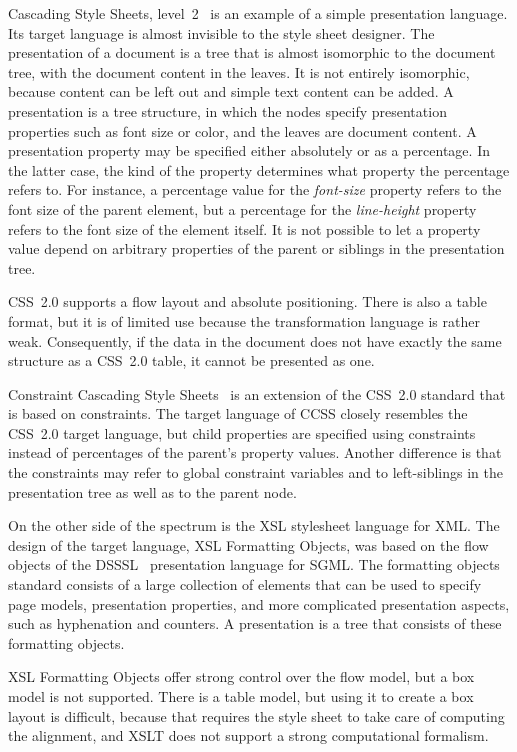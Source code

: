  Cascading Style Sheets, level~2~\cite{css2} is an example of a simple presentation language. Its target language is almost invisible to the style sheet designer.  \bc The presentation of a document is a tree that is almost isomorphic to the document tree, with the document content in the leaves. It is not entirely isomorphic, because content can be left out and simple text content can be added.  \ec A presentation is a tree structure, in which the nodes specify presentation properties such as font size or color, and the leaves are document content. A presentation property may be specified either absolutely or as a percentage. In the latter case, the kind of the property determines what property the percentage refers to. For instance, a percentage value for the {\em font-size} property refers to the font size of the parent element, but a percentage for the {\em line-height} property refers to the font size of the element itself. It is not possible to let a property value depend on arbitrary properties of the parent or siblings in the presentation tree.

CSS~2.0 supports a flow layout and absolute positioning. There is also a table format, but it is of limited use because the transformation language is rather weak. Consequently, if the data in the document does not have exactly the same structure as a CSS~2.0 table, it cannot be presented as one.

 Constraint Cascading Style Sheets~\cite{badros99ccss} is an extension of the CSS~2.0 standard that is based on constraints. The target language of CCSS closely resembles the CSS~2.0 target language, but child properties are specified using constraints instead of percentages of the parent's property values. Another difference is that the constraints may refer to global constraint variables and to left-siblings in the presentation tree as well as to the parent node. 

 On the other side of the spectrum is the XSL stylesheet language for XML. The design of the target language, XSL Formatting Objects, was based on the flow objects of the DSSSL~\cite{dsssl96} presentation language for SGML. The formatting objects standard consists of a large collection of elements that can be used to specify page models, presentation properties, and more complicated presentation aspects, such as hyphenation and counters. A presentation is a tree that consists of these formatting objects. 

XSL Formatting Objects offer strong control over the flow model, but a box model is not supported. There is a table model, but using it to create a box layout is difficult, because that requires the style sheet to take care of computing the alignment, and XSLT does not support a strong computational formalism.

